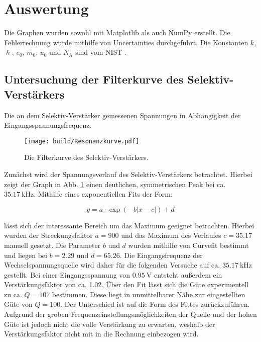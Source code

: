 \section{Auswertung}
\label{sec:Auswertung}

Die Graphen wurden sowohl mit Matplotlib \cite{matplotlib} als auch NumPy \cite{numpy} erstellt. Die
 Fehlerrechnung wurde mithilfe von Uncertainties \cite{uncertainties} durchgeführt.
Die Konstanten $k$, $\hslash$, $e_0$, $m_0$, $u_0$ und $N_\text{A}$ sind vom NIST \cite{nistgov}.
\subsection{Untersuchung der Filterkurve des Selektiv-Verstärkers}

\begin{center}
	\begin{table}
		\caption{Die an dem Selektiv-Verstärker gemessenen Spannungen in Abhängigkeit der Eingangsspannungsfrequenz.}
		\begin{minipage}[t]{0.5\textwidth}
			\centering
			
		\end{minipage}
		\begin{minipage}[t]{0.5\textwidth}
			\centering
			
		\end{minipage}
	\end{table}
\end{center}


\begin{figure}
 \centering
 \caption{Die Filterkurve des Selektiv-Verstärkers.}
 \texttt{[image: build/Resonanzkurve.pdf]}
 \label{fig:GraphSelektiv}
\end{figure}

Zunächst wird der Spannungsverlauf des Selektiv-Verstärkers betrachtet. Hierbei
zeigt der Graph in Abb. \ref{fig:GraphSelektiv} einen deutlichen, symmetrischen
Peak bei ca. $\SI{35.17}{\kilo\hertz}$. Mithilfe eines exponentiellen Fits der Form:

\begin{equation}
  y = a \cdot \exp(-b|x-c|)+d
  \end{equation}

lässt sich der interessante Bereich um das Maximum geeignet betrachten. Hierbei
wurden der Streckungsfaktor $a = 900$ und das Maximum des Verlaufes $c = 35.17$ manuell gesetzt. Die Parameter $b$
und $d$ wurden mithilfe von Curvefit bestimmt und liegen bei $b = 2.29$ und $d = 65.26$.
Die Eingangsfrequenz der
Wechselspannungsquelle wird daher für die folgenden Versuche auf ca. $\SI{35.17}{\kilo\hertz}$
gestellt. Bei einer Eingangsspannung von $\SI{0.95}{\volt}$ entsteht außerdem ein
Verstärkungsfaktor von ca. 1.02.
Über den Fit lässt sich die Güte experimentell zu ca. $Q = 107$ bestimmen. Diese
liegt in unmittelbarer Nähe zur eingestellten Güte von $Q = 100$. Der Unterschied
ist auf die Form des Fittes zurückzuführen. Aufgrund der groben Frequenzeinstellungsmöglichkeiten der Quelle und der hohen Güte
ist jedoch nicht die volle Verstärkung zu erwarten,
 weshalb der Verstärkungsfaktor nicht mit in die Rechnung einbezogen wird.

